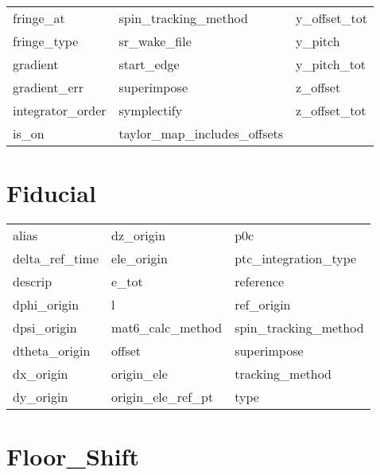 \begin{tabular}{lll}
fringe_at                   & spin_tracking_method        & y_offset_tot                \\
fringe_type                 & sr_wake_file                & y_pitch                     \\
gradient                    & start_edge                  & y_pitch_tot                 \\
gradient_err                & superimpose                 & z_offset                    \\
integrator_order            & symplectify                 & z_offset_tot                \\
is_on                       & taylor_map_includes_offsets &                             \\
 \bottomrule
 \end{tabular}
 \vfill
 
 \section{Fiducial}
 \label{s:list.fiducial}
 
 \begin{tabular}{lll} \toprule
alias                       & dz_origin                   & p0c                         \\
delta_ref_time              & ele_origin                  & ptc_integration_type        \\
descrip                     & e_tot                       & reference                   \\
dphi_origin                 & l                           & ref_origin                  \\
dpsi_origin                 & mat6_calc_method            & spin_tracking_method        \\
dtheta_origin               & offset                      & superimpose                 \\
dx_origin                   & origin_ele                  & tracking_method             \\
dy_origin                   & origin_ele_ref_pt           & type                        \\
 \bottomrule
 \end{tabular}
 \vfill
 
 \section{Floor_Shift}
 \label{s:list.floor.shift}
 
